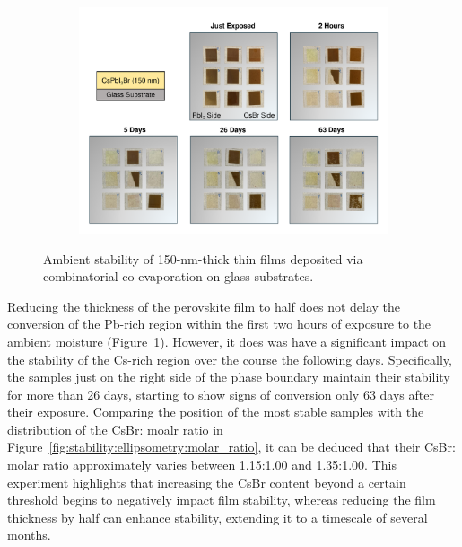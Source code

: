 \begin{figure}[htbp]
    \centering
    \begin{subfigure}[t]{0.99\textwidth}
        \centering
        \includegraphics[width=\textwidth]{chapters/stability/imeges/Stability_No_Rotation_139nm_on_glass.pdf} %
    \end{subfigure}

    \caption{Ambient stability of 150-nm-thick  thin films deposited via combinatorial co-evaporation on glass substrates.}
    \label{fig:stability:no_rotation:150nm_glass}
\end{figure}

Reducing the thickness of the perovskite film to half does not delay the conversion of the Pb-rich region within the first two hours of exposure to the ambient moisture (Figure~\ref{fig:stability:no_rotation:150nm_glass}). However, it does was have a significant impact on the stability of the Cs-rich region over the course the following days. Specifically, the samples just on the right side of the phase boundary maintain their stability for more than 26 days, starting to show signs of conversion only 63 days after their exposure. Comparing the position of the most stable samples with the distribution of the CsBr: moalr ratio in Figure~\ref{fig:stability:ellipsometry:molar_ratio}, it can be deduced that their CsBr: molar ratio approximately varies between 1.15:1.00 and 1.35:1.00. This experiment highlights that increasing the CsBr content beyond a certain threshold begins to negatively impact film stability, whereas reducing the film thickness by half can enhance stability, extending it to a timescale of several months.

